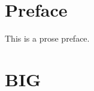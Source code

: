 \documentclass[12pt]{book}
\begin{document}
\BgThispage
\maketitle
\makededication
\frontmatter

\maketoc

\renewcommand*{\topname}{Table of Poems}

\maketop

\section{Preface}
This is a prose preface.

\newpage
\thispagestyle{empty}

\mainmatter
\newcommand{\introductionvar}{introduction_big.tex}


\newcommand{\chaptersvar}{gen_chapter_list.tex}

\section{BIG}


\end{document}
